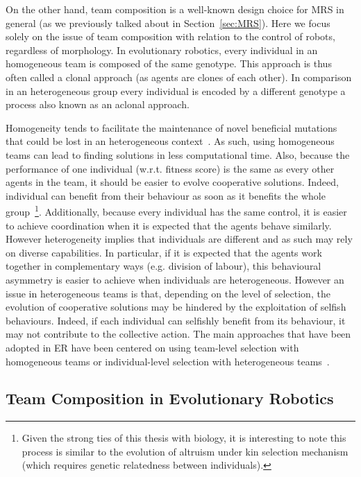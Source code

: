     On the other hand, team composition is a well-known design choice for MRS in general (as we previously talked about in Section~\ref{sec:MRS}). Here we focus solely on the issue of team composition with relation to the control of robots, regardless of morphology. In evolutionary robotics, every individual in an homogeneous team is composed of the same genotype. This approach is thus often called a clonal approach (as agents are clones of each other). In comparison in an heterogeneous group every individual is encoded by a different genotype a process also known as an aclonal approach.

    Homogeneity tends to facilitate the maintenance of novel beneficial mutations that could be lost in an heterogeneous context~\parencite{Quinn2001}. As such, using homogeneous teams can lead to finding solutions in less computational time. Also, because the performance of one individual (w.r.t. fitness score) is the same as every other agents in the team, it should be easier to evolve cooperative solutions. Indeed, individual can benefit from their behaviour as soon as it benefits the whole group~\footnote{Given the strong ties of this thesis with biology, it is interesting to note this process is similar to the evolution of altruism under kin selection mechanism (which requires genetic relatedness between individuals).}. Additionally, because every individual has the same control, it is easier to achieve coordination when it is expected that the agents behave similarly. However heterogeneity implies that individuals are different and as such may rely on diverse capabilities. In particular, if it is expected that the agents work together in complementary ways (e.g. division of labour), this behavioural asymmetry is easier to achieve when individuals are heterogeneous. However an issue in heterogeneous teams is that, depending on the level of selection, the evolution of cooperative solutions may be hindered by the exploitation of selfish behaviours. Indeed, if each individual can selfishly benefit from its behaviour, it may not contribute to the collective action. The main approaches that have been adopted in ER have been centered on using team-level selection with homogeneous teams or individual-level selection with heterogeneous teams~\parencite{Waibel2009}.

  \subsection{Team Composition in Evolutionary Robotics} %

